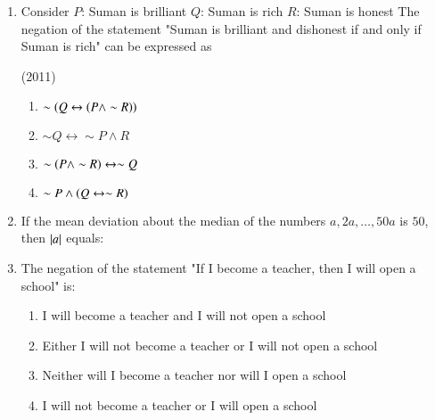 \documentclass[journal,12pt,twocolumn]{IEEEtran}
\theoremstyle{remark}
\begin{document}
\begin{enumerate}
    \item Consider \newline
    \quad $P$: Suman is brilliant\newline
    \quad $Q$: Suman is rich\newline
    \quad $R$: Suman is honest\newline
    The negation of the statement "Suman is brilliant and dishonest if and only if Suman is rich" can be expressed as
    
    \hfill{(2011)}
    \begin{enumerate}
    \item $\sim \left(Q \leftrightarrow \left(P \land \sim R\right)\right)$
    \item $\sim Q \leftrightarrow \sim P \land R$
    \item $\sim \left(P \land \sim R\right) \leftrightarrow \sim Q$
    \item $\sim P \land \left(Q \leftrightarrow \sim R\right)$
    \end{enumerate}
    
    \item If the mean deviation about the median of the numbers $a, 2a, \dots, 50a$ is $50$, then $\left\vert a\right\vert$ equals:
    
    \hfill{}
    \begin{enumerate}
    \end{enumerate}
    
    \item The negation of the statement\newline
    "If I become a teacher, then I will open a school" is:
    
    \hfill{}
    \begin{enumerate}
        \item I will become a teacher and I will not open a school
        \item Either I will not become a teacher or I will not open a school
        \item Neither will I become a teacher nor will I open a school
        \item I will not become a teacher or I will open a school
    \end{enumerate}
    

\end{enumerate}
\end{document}
